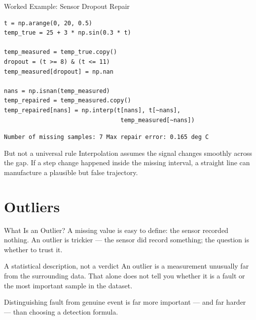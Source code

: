 \documentclass[9pt,aspectratio=169,xcolor=table]{beamer}
\begin{document}
\begin{frame}[fragile]{Worked Example: Sensor Dropout Repair}
    \leavevmode
\begin{lstlisting}
t = np.arange(0, 20, 0.5)
temp_true = 25 + 3 * np.sin(0.3 * t)

temp_measured = temp_true.copy()
dropout = (t >= 8) & (t <= 11)
temp_measured[dropout] = np.nan

nans = np.isnan(temp_measured)
temp_repaired = temp_measured.copy()
temp_repaired[nans] = np.interp(t[nans], t[~nans],
                                 temp_measured[~nans])
\end{lstlisting}
    \texttt{\scriptsize Number of missing samples: 7 \quad Max repair error: 0.165 deg C}

    \vspace{2mm}
    \begin{block}{But not a universal rule}
        Interpolation assumes the signal changes \alert{smoothly}
        across the gap. If a step change happened inside the missing
        interval, a straight line can manufacture a plausible but
        false trajectory.
    \end{block}
\end{frame}

\section{Outliers}

\begin{frame}{What Is an Outlier?}
    \leavevmode
    A missing value is easy to define: the sensor recorded nothing. An
    outlier is trickier --- the sensor \alert{did} record something;
    the question is whether to trust it.

    \vspace{2mm}
    \begin{alertblock}{A statistical description, not a verdict}
        An outlier is a measurement unusually far from the surrounding
        data. That alone does not tell you whether it is a fault or
        the most important sample in the dataset.
    \end{alertblock}

    \vspace{2mm}
    {\small Distinguishing fault from genuine event is far more
    important --- and far harder --- than choosing a detection
    formula.}
\end{frame}
\end{document}
